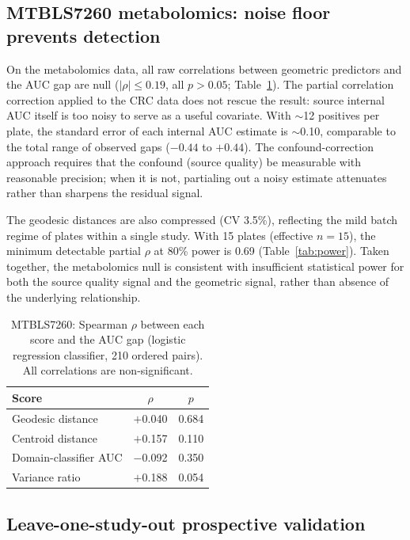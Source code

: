 \documentclass[11pt]{article}
\begin{document}
\subsection{MTBLS7260 metabolomics: noise floor prevents detection}
\label{sec:metabolomics}

On the metabolomics data, all raw correlations between geometric predictors and the AUC gap are null ($|\rho| \leq 0.19$, all $p > 0.05$; Table~\ref{tab:baselines_metab}). The partial correlation correction applied to the CRC data does not rescue the result: source internal AUC itself is too noisy to serve as a useful covariate. With $\sim$12 positives per plate, the standard error of each internal AUC estimate is $\sim$0.10, comparable to the total range of observed gaps ($-0.44$ to $+0.44$). The confound-correction approach requires that the confound (source quality) be measurable with reasonable precision; when it is not, partialing out a noisy estimate attenuates rather than sharpens the residual signal.

The geodesic distances are also compressed (CV 3.5\%), reflecting the mild batch regime of plates within a single study. With 15 plates (effective $n = 15$), the minimum detectable partial $\rho$ at 80\% power is 0.69 (Table~\ref{tab:power}). Taken together, the metabolomics null is consistent with insufficient statistical power for both the source quality signal and the geometric signal, rather than absence of the underlying relationship.

\begin{table}[t]
\centering
\caption{MTBLS7260: Spearman $\rho$ between each score and the AUC gap (logistic regression classifier, 210 ordered pairs). All correlations are non-significant.}
\label{tab:baselines_metab}
\begin{tabular}{lcc}
\toprule
Score & $\rho$ & $p$ \\
\midrule
Geodesic distance     & $+$0.040 & 0.684 \\
Centroid distance     & $+$0.157 & 0.110 \\
Domain-classifier AUC & $-$0.092 & 0.350 \\
Variance ratio        & $+$0.188 & 0.054 \\
\bottomrule
\end{tabular}
\end{table}


\subsection{Leave-one-study-out prospective validation}
\label{sec:loo}
\end{document}
